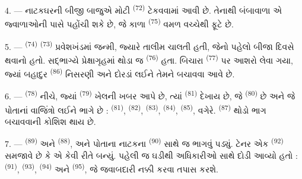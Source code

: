 4. --- નાટકઘરની બીજી બાજુએ મોટી  \textsuperscript{(72)}
ટેકવવામાં આવી છે. તેનાથી બંબાવાળા એ જ્વાળાઓની પાસે પહોંચી શકે છે, જે
કાળા  \textsuperscript{(75)} વમળ વચ્ચેથી ફૂટે છે.

\VUsaut{5.0mm}
\VUsaut{3.4mm}

5. ---  \textsuperscript{(74)} 
\textsuperscript{(73)} પ્રવેશખંડમાં જન્મી, જ્યારે 
તાલીમ ચાલતી હતી, જેનો પહેલો  બીજા દિવસે થવાનો હતો.
સદ્ભાગ્યે પ્રેક્ષાગૃહમાં થોડા જ 
\textsuperscript{(76)} હતા. બિચારા 
\textsuperscript{(77)} પર આશરો લેવા ગયા, જ્યાં બહાદુર
 \textsuperscript{(86)} નિસરણી અને દોરડાં લઈને તેમને
બચાવવા આવે છે.

6. ---  \textsuperscript{(78)} નીચે, જ્યાં
 \textsuperscript{(79)} ખેલની ખબર આપે છે,
ત્યાં  \textsuperscript{(81)} દેખાય છે, જે
 \textsuperscript{(80)} છે અને જે પોતાનાં વાજિંત્રો
લઈને ભાગે છે :  \textsuperscript{(81)},
 \textsuperscript{(82)}, 
\textsuperscript{(83)},  \textsuperscript{(84)},
 \textsuperscript{(85)}, વગેરે. 
\textsuperscript{(87)} થોડો ભાગ બચાવવાની કોશિશ થાય છે.

7. ---  \textsuperscript{(89)} અને 
\textsuperscript{(88)},  અને  પોતાના
નાટકના  \textsuperscript{(90)} સાથે જ ભાગવું પડ્યું.
ટેનર એક  \textsuperscript{(92)} સમજાવે છે કે એ કેવી
રીતે બન્યું.  પહેલી જ ઘડીથી અધિકારીઓ સાથે દોડી આવ્યો
હતો :  \textsuperscript{(91)}, 
\textsuperscript{(93)},  \textsuperscript{(94)}
અને  \textsuperscript{(95)}, જે જવાબદારી નક્કી
કરવા તપાસ કરશે.

\VUsaut{6.0mm}
\VUfilet{22mm}
